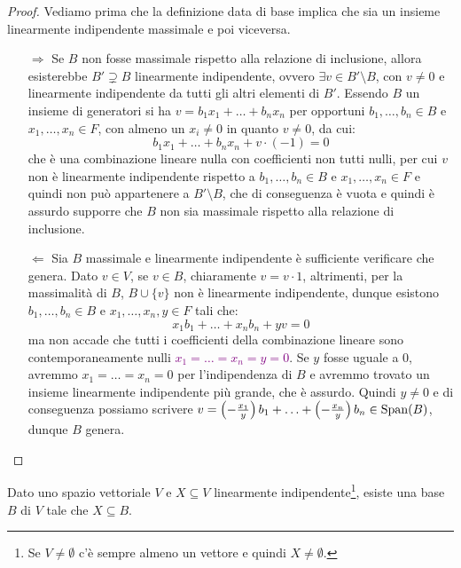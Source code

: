 \begin{proof}
	Vediamo prima che la definizione data di base implica che sia un insieme linearmente indipendente massimale e poi viceversa.
	\begin{itemize}
		\item[$\boxed{\Longrightarrow}$] Se $B$ non fosse massimale rispetto alla relazione di inclusione, allora esisterebbe $B' \supsetneq B$ linearmente indipendente, ovvero $\exists v \in B' \setminus B$, con $v \ne 0$ e linearmente indipendente da tutti gli altri elementi di $B'$. Essendo $B$ un insieme di generatori si ha
		$v = b_1x_1 + \ldots + b_nx_n$ per opportuni $b_1,\ldots,b_n \in B$ e $x_1,\ldots,x_n \in F$, con almeno un $x_i \ne 0$ in quanto $v \ne 0$, da cui:
		\[ b_1x_1 + \ldots + b_nx_n + v \cdot (-1) = 0
			\]
		che è una combinazione lineare nulla con coefficienti non tutti nulli, per cui $v$ non è linearmente indipendente rispetto a $b_1,\ldots,b_n \in B$ e $x_1,\ldots,x_n \in F$ e quindi non può appartenere a $B'\setminus B$, che di conseguenza è vuota e quindi è assurdo supporre che $B$ non sia massimale rispetto alla relazione di inclusione.
		\item[$\boxed{\Longleftarrow}$] Sia $B$ massimale e linearmente indipendente è sufficiente verificare che genera. Dato $v \in V$, se $v \in B$, chiaramente $v = v \cdot 1$, altrimenti, per la massimalità di $B$, $B \cup \{v\}$ non è linearmente indipendente, dunque
		esistono $b_1,\ldots,b_n \in B$ e $x_1,\ldots,x_n,y \in F$ tali che:
		\[ x_1b_1 + \ldots + x_nb_n + yv = 0
			\]
		ma non accade che tutti i coefficienti della combinazione lineare sono contemporaneamente nulli \textcolor{purple}{$x_1 = \ldots = x_n = y = 0$}.
		Se $y$ fosse uguale a 0, avremmo $x_1 = \ldots = x_n = 0$ per l'indipendenza di $B$ e avremmo trovato un insieme linearmente indipendente più grande, che è assurdo.
		Quindi $y \ne 0$ e di conseguenza possiamo scrivere $v = \left(-\frac{x_1}{y}\right)b_1 + \ldots + \left(-\frac{x_n}{y}\right)b_n \in \operatorname{Span}(B)$, dunque $B$ genera.
	\end{itemize}
\end{proof}

\begin{proposition}
	Dato uno spazio vettoriale $V$ e $X \subseteq V$ linearmente indipendente\footnote{Se $V \ne\emptyset$ c'è sempre almeno un vettore e quindi $X \ne \emptyset$.}, esiste una base $B$ di $V$ tale che $X \subseteq B$.
\end{proposition}

